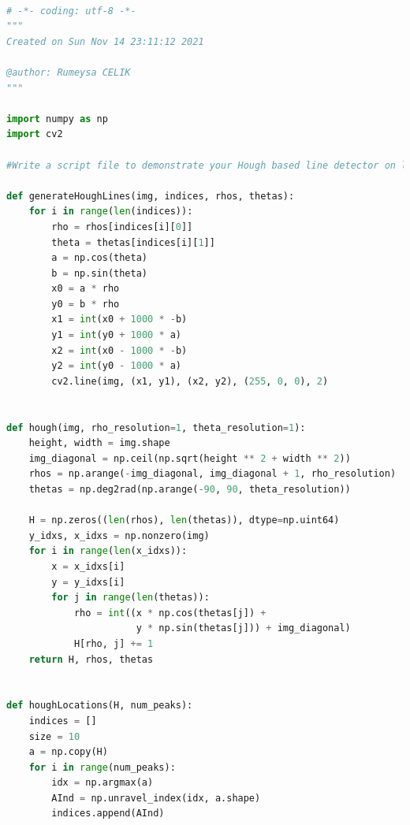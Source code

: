 \documentclass[a4paper, 12pt]{report}
\begin{document}
{{

\lstset{style=mystyle}
\begin{lstlisting}[language=Python]

# -*- coding: utf-8 -*-
"""
Created on Sun Nov 14 23:11:12 2021

@author: Rumeysa CELIK
"""

import numpy as np
import cv2

#Write a script file to demonstrate your Hough based line detector on live video.

def generateHoughLines(img, indices, rhos, thetas):
    for i in range(len(indices)):
        rho = rhos[indices[i][0]]
        theta = thetas[indices[i][1]]
        a = np.cos(theta)
        b = np.sin(theta)
        x0 = a * rho
        y0 = b * rho
        x1 = int(x0 + 1000 * -b)
        y1 = int(y0 + 1000 * a)
        x2 = int(x0 - 1000 * -b)
        y2 = int(y0 - 1000 * a)
        cv2.line(img, (x1, y1), (x2, y2), (255, 0, 0), 2)


def hough(img, rho_resolution=1, theta_resolution=1):
    height, width = img.shape
    img_diagonal = np.ceil(np.sqrt(height ** 2 + width ** 2))
    rhos = np.arange(-img_diagonal, img_diagonal + 1, rho_resolution)
    thetas = np.deg2rad(np.arange(-90, 90, theta_resolution))

    H = np.zeros((len(rhos), len(thetas)), dtype=np.uint64)
    y_idxs, x_idxs = np.nonzero(img)
    for i in range(len(x_idxs)):
        x = x_idxs[i]
        y = y_idxs[i]
        for j in range(len(thetas)):
            rho = int((x * np.cos(thetas[j]) +
                       y * np.sin(thetas[j])) + img_diagonal)
            H[rho, j] += 1
    return H, rhos, thetas


def houghLocations(H, num_peaks):
    indices = []
    size = 10
    a = np.copy(H)
    for i in range(num_peaks):
        idx = np.argmax(a)
        AInd = np.unravel_index(idx, a.shape)
        indices.append(AInd)


\end{lstlisting}}}
\end{document}
